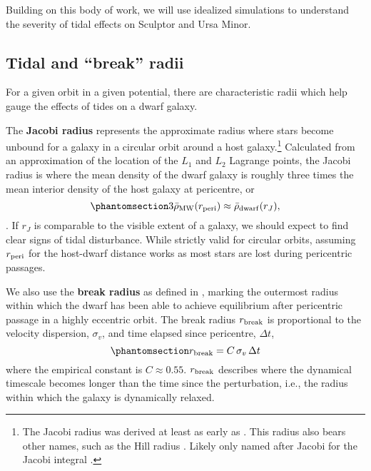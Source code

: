 Building on this body of work, we will use idealized simulations to
understand the severity of tidal effects on Sculptor and Ursa Minor.

\subsection{Tidal and ``break'' radii}\label{sec:break_radii}

For a given orbit in a given potential, there are characteristic radii
which help gauge the effects of tides on a dwarf galaxy.

The \textbf{Jacobi radius} represents the approximate radius where stars
become unbound for a galaxy in a circular orbit around a host
galaxy.\footnote{The Jacobi radius was derived at least as early as
  \citet{laplace1798}. This radius also bears other names, such as the
  Hill radius \citep[from][]{hill1878}. Likely only named after Jacobi
  for the Jacobi integral \citep{jacobi1836}.} Calculated from an
approximation of the location of the \(L_1\) and \(L_2\) Lagrange
points, the Jacobi radius is where the mean density of the dwarf galaxy
is roughly three times the mean interior density of the host galaxy at
pericentre, or
\begin{equation}\protect\phantomsection\label{eq:r_jacobi}{
3\bar \rho_{\rm MW}(r_{\rm peri}) \approx \bar \rho_{\rm dwarf}(r_J),
}\end{equation} \citep[ eq. 7-84]{BT1987}. If \(r_J\) is comparable to
the visible extent of a galaxy, we should expect to find clear signs of
tidal disturbance. While strictly valid for circular orbits, assuming
\(r_{\rm peri}\) for the host-dwarf distance works as most stars are
lost during pericentric passages.

We also use the \textbf{break radius} as defined in
\citet{penarrubia+2009}, marking the outermost radius within which the
dwarf has been able to achieve equilibrium after pericentric passage in
a highly eccentric orbit. The break radius \(r_{\rm break}\) is
proportional to the velocity dispersion, \(\sigma_v\), and time elapsed
since pericentre, \(\Delta t\),
\begin{equation}\protect\phantomsection\label{eq:r_break}{
r_{\rm break} = C\,\sigma_{v}\,\Delta t
}\end{equation} where the empirical constant is \(C \approx 0.55\).
\(r_{\rm break}\) describes where the dynamical timescale becomes longer
than the time since the perturbation, i.e., the radius within which the
galaxy is dynamically relaxed.

